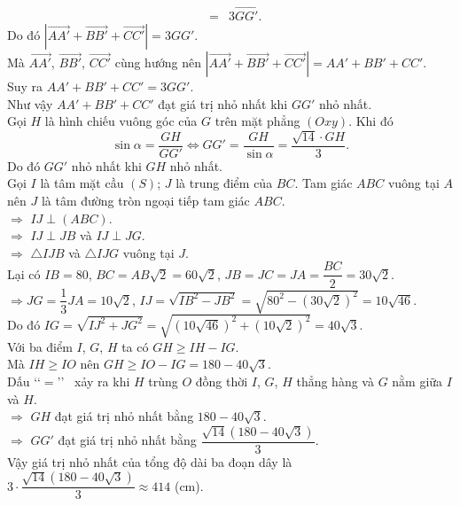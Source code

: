 \begin{ex}
{\begin{eqnarray*}
			&=& 3\overrightarrow{GG'}. 
		\end{eqnarray*}
		Do đó $\left|\overrightarrow{AA'}+\overrightarrow{BB'}+\overrightarrow{CC'}\right|=3GG'$. \\
		Mà $\overrightarrow{AA'}$, $\overrightarrow{BB'}$, $\overrightarrow{CC'}$ cùng hướng nên $\left|\overrightarrow{AA'}+\overrightarrow{BB'}+\overrightarrow{CC'}\right|=AA'+BB'+CC'$. \\
		Suy ra $AA'+BB'+CC'=3GG'$. \\
		Như vậy $AA'+BB'+CC'$ đạt giá trị nhỏ nhất khi $GG'$ nhỏ nhất. \\
		Gọi $H$ là hình chiếu vuông góc của $G$ trên mặt phẳng $(Oxy)$. Khi đó 
		\[\sin\alpha=\dfrac{GH}{GG'} \Leftrightarrow GG'=\dfrac{GH}{\sin\alpha}=\dfrac{\sqrt{14} \cdot GH}{3}.\]
		Do đó $GG'$ nhỏ nhất khi $GH$ nhỏ nhất. \\
		Gọi $I$ là tâm mặt cầu $(S)$; $J$ là trung điểm của $BC$. Tam giác $ABC$ vuông tại $A$ nên $J$ là tâm đường tròn ngoại tiếp tam giác $ABC$. \\
		$\Rightarrow$ $IJ \perp (ABC)$.\\
		$\Rightarrow$ $IJ \perp JB$ và $IJ \perp JG$. \\
		$\Rightarrow$ $\triangle IJB$ và $\triangle IJG$ vuông tại $J$. \\
		Lại có $IB=80$, $BC=AB\sqrt{2}=60\sqrt{2}$, $JB=JC=JA=\dfrac{BC}{2}=30\sqrt{2}$. \\
		$\Rightarrow JG=\dfrac{1}{3}JA=10\sqrt{2}$, $IJ=\sqrt{IB^2-JB^2}=\sqrt{80^2-(30\sqrt{2})^2}=10\sqrt{46}$. \\
		Do đó $IG=\sqrt{IJ^2+JG^2}=\sqrt{(10\sqrt{46})^2+(10\sqrt{2})^2}=40\sqrt{3}$. \\
		Với ba điểm $I$, $G$, $H$ ta có $GH \ge IH-IG$. \\
		Mà $IH \ge IO$ nên $GH \ge IO-IG=180-40\sqrt{3}$. \\
		Dấu \lq\lq $=$\rq\rq~ xảy ra khi $H$ trùng $O$ đồng thời $I$, $G$, $H$ thẳng hàng và $G$ nằm giữa $I$ và $H$. \\
		$\Rightarrow$ $GH$ đạt giá trị nhỏ nhất bằng $180-40\sqrt{3}$. \\
		$\Rightarrow$ $GG'$ đạt giá trị nhỏ nhất bằng $\dfrac{\sqrt{14}\left(180-40\sqrt{3}\right)}{3}$. \\
		Vậy giá trị nhỏ nhất của tổng độ dài ba đoạn dây là $3 \cdot \dfrac{\sqrt{14}\left(180-40\sqrt{3}\right)}{3} \approx 414$ (cm).
	}
\end{ex}
